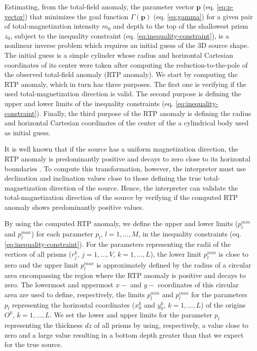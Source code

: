 Estimating, from the total-field anomaly, the parameter vector $\mathbf{p}$ (eq. \ref{eq:p-vector}) that minimizes the goal function $\Gamma(\mathbf{p})$ (eq. \ref{eq:gamma}) 
for a given pair of total-magnetization intensity $m_{0}$ and depth to the top of the 
shallowest prism $z_{0}$, subject to the inequality constraint 
(eq. \ref{eq:inequality-constraint}), is a nonlinear inverse problem 
which requires an initial guess of the 3D source shape. 
The initial guess is a simple cylinder whose radius and horizontal Cartesian coordinates of its center were taken after computing the reduction-to-the-pole of the observed total-field anomaly (RTP anomaly).
We start by computing the RTP anomaly, which in turn has three purposes.
The first one is verifying if the used total-magnetization direction is valid.
The second purpose is defining the upper and lower limits of the inequality constraints 
(eq. \ref{eq:inequality-constraint}).
Finally, the third purpose of the RTP anomaly is defining the radius and horizontal Cartesian coordinates of the center of the a cylindrical body used as initial guess.

It is well known that if the source has a uniform magnetization direction, 
the RTP anomaly is predominantly positive and decays to zero close to its 
horizontal boundaries \cite[e.g.,][p. 331]{blakely1996}. 
To compute this transformation, however, the interpreter must use declination and
inclination values close to those defining the true total-magnetization direction
of the source. 
Hence, the interpreter can validate the total-magnetization direction of the source 
by verifying if the computed RTP anomaly shows predominantly positive values.

By using the computed RTP anomaly, we define the upper and lower limits 
($p_{l}^{min}$ and $p_{l}^{max}$) for each parameter $p_{l}$, $l = 1, \dots, M$, 
in the inequality constraints (eq. \ref{eq:inequality-constraint}). 
For the parameters representing the radii of the vertices of all prisms 
($r^{k}_{j}$, $j=1,\dots , V$, $k=1,\dots ,L$), the lower limit $p_{l}^{min}$ 
is close to zero and the upper limit $p_{l}^{max}$ is approximately defined by 
the radius of a circular area encompassing the region where the RTP anomaly is 
positive and decays to zero.
The lowermost and uppermost $x-$ and $y-$ coordinates of this circular area 
are used to define, respectively, the limits $p_{l}^{min}$ and $p_{l}^{max}$
for the parameters $p_{l}$ representing the horizontal coordinates
($x_{0}^{k}$ and $y_{0}^{k}$, $k=1,\dots ,L$) of the origins $O^{k}$, 
$k=1,\dots ,L$. 
We set the lower and upper limits for the parameter $p_{l}$ 
representing the thickness $dz$ of all prisms by using, respectively, 
a value close to zero and a large value resulting in a 
bottom depth greater than that we expect for the true source. 

